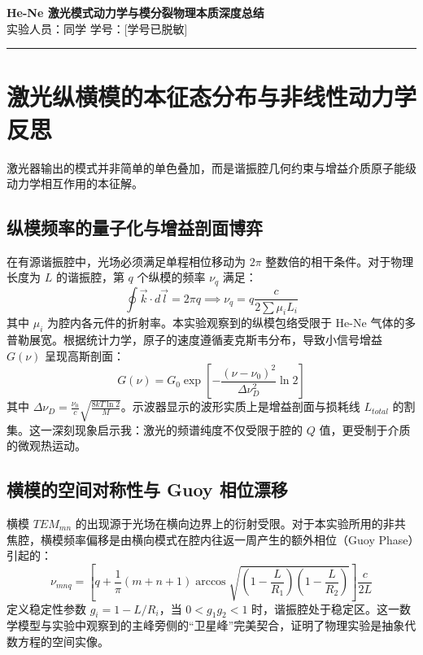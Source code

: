 \documentclass[12pt,a4paper]{article}
\begin{document}
\begin{center}
    \LARGE \textbf{He-Ne 激光模式动力学与模分裂物理本质深度总结} \\
    \vspace{0.8em}
    \large 实验人员：同学 \quad 学号：[学号已脱敏] \\
    \vspace{0.4em}
    \rule{\textwidth}{1pt}
\end{center}

\section{激光纵横模的本征态分布与非线性动力学反思}

激光器输出的模式并非简单的单色叠加，而是谐振腔几何约束与增益介质原子能级动力学相互作用的本征解。

\subsection{纵模频率的量子化与增益剖面博弈}
在有源谐振腔中，光场必须满足单程相位移动为 $2\pi$ 整数倍的相干条件。对于物理长度为 $L$ 的谐振腔，第 $q$ 个纵模的频率 $\nu_q$ 满足：
\begin{equation}
    \oint \vec{k} \cdot d\vec{l} = 2\pi q \implies \nu_{q} = q \frac{c}{2 \sum \mu_i L_i}
\end{equation}
其中 $\mu_i$ 为腔内各元件的折射率。本实验观察到的纵模包络受限于 He-Ne 气体的多普勒展宽。根据统计力学，原子的速度遵循麦克斯韦分布，导致小信号增益 $G(\nu)$ 呈现高斯剖面：
\begin{equation}
    G(\nu) = G_0 \exp \left[ -\frac{(\nu - \nu_0)^2}{\Delta \nu_D^2} \ln 2 \right]
\end{equation}
其中 $\Delta \nu_D = \frac{\nu_0}{c} \sqrt{\frac{8kT \ln 2}{M}}$。示波器显示的波形实质上是增益剖面与损耗线 $L_{total}$ 的割集。这一深刻现象启示我：激光的频谱纯度不仅受限于腔的 $Q$ 值，更受制于介质的微观热运动。

\subsection{横模的空间对称性与 Guoy 相位漂移}
横模 $TEM_{mn}$ 的出现源于光场在横向边界上的衍射受限。对于本实验所用的非共焦腔，横模频率偏移是由横向模式在腔内往返一周产生的额外相位（Guoy Phase）引起的：
\begin{equation}
    \nu_{mnq} = \left[ q + \frac{1}{\pi}(m+n+1) \arccos \sqrt{(1-\frac{L}{R_1})(1-\frac{L}{R_2})} \right] \frac{c}{2L}
\end{equation}
定义稳定性参数 $g_i = 1 - L/R_i$，当 $0 < g_1 g_2 < 1$ 时，谐振腔处于稳定区。这一数学模型与实验中观察到的主峰旁侧的“卫星峰”完美契合，证明了物理实验是抽象代数方程的空间实像。
\end{document}
